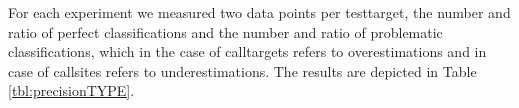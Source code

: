 For each experiment we measured two data points per testtarget, the number and ratio of perfect classifications and the number and ratio of problematic classifications, which in the case of calltargets refers to overestimations and in case of callsites refers to underestimations. The results are depicted in Table \ref{tbl:precisionTYPE}.
\begin{table}[h!]
		\caption {The results for analysis of the \textit{type} policy on the O2 optimization level.}
		\label{tbl:precisionTYPE}
\end{table}~\\
